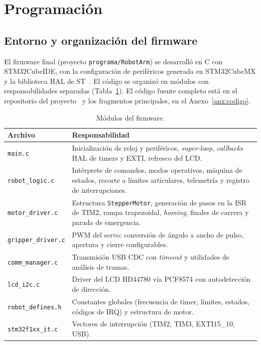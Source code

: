 \section{Programación}\label{sec:programacion}

\subsection{Entorno y organización del firmware}
El firmware final (proyecto \texttt{programa/RobotArm}) se desarrolló en C con STM32CubeIDE,
con la configuración de periféricos generada en STM32CubeMX y la biblioteca HAL de
ST~\cite{hal}. El código se organizó en módulos con responsabilidades separadas
(Tabla~\ref{tab:modulos-fw}). El código fuente completo está en el repositorio del
proyecto~\cite{repo} y los fragmentos principales, en el Anexo~\ref{anx:codigo}.

\begin{table}[H]
\centering\small
\caption{Módulos del firmware.}\label{tab:modulos-fw}
\begin{tabularx}{\textwidth}{@{}l X@{}}
\toprule
\textbf{Archivo} & \textbf{Responsabilidad}\\
\midrule
\texttt{main.c} & Inicialización de reloj y periféricos, \emph{super-loop}, \emph{callbacks} HAL de timers y EXTI, refresco del LCD.\\
\texttt{robot\_logic.c} & Intérprete de comandos, modos operativos, máquina de estados, recorte a límites articulares, telemetría y registro de interrupciones.\\
\texttt{motor\_driver.c} & Estructura \texttt{StepperMotor}, generación de pasos en la ISR de TIM2, rampa trapezoidal, \emph{homing}, finales de carrera y parada de emergencia.\\
\texttt{gripper\_driver.c} & PWM del servo: conversión de ángulo a ancho de pulso, apertura y cierre configurables.\\
\texttt{comm\_manager.c} & Transmisión USB CDC con \emph{timeout} y utilidades de análisis de tramas.\\
\texttt{lcd\_i2c.c} & Driver del LCD HD44780 vía PCF8574 con autodetección de dirección.\\
\texttt{robot\_defines.h} & Constantes globales (frecuencia de timer, límites, estados, códigos de IRQ) y estructura de motor.\\
\texttt{stm32f1xx\_it.c} & Vectores de interrupción (TIM2, TIM3, EXTI15\_10, USB).\\
\bottomrule
\end{tabularx}
\end{table}

